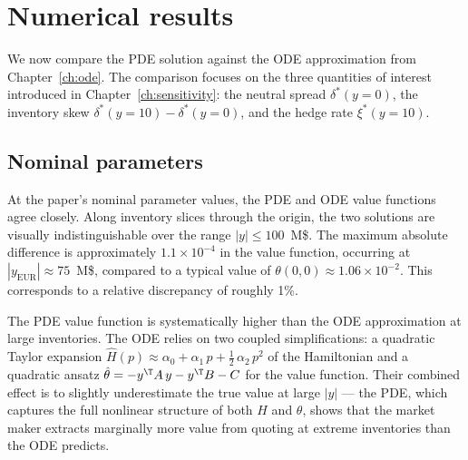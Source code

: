 \section{Numerical results}
\label{sec:pde-results}

We now compare the PDE solution against the ODE approximation from Chapter~\ref{ch:ode}. The comparison focuses on the three quantities of interest introduced in Chapter~\ref{ch:sensitivity}: the neutral spread $\delta^*(y = 0)$, the inventory skew $\delta^*(y = 10) - \delta^*(y = 0)$, and the hedge rate $\xi^*(y = 10)$.


\subsection{Nominal parameters}
\label{sec:pde-nominal}

At the paper's nominal parameter values, the PDE and ODE value functions agree closely. Along inventory slices through the origin, the two solutions are visually indistinguishable over the range $|y| \leq 100$~M\$. The maximum absolute difference is approximately $1.1 \times 10^{-4}$ in the value function, occurring at $|y_{\text{EUR}}| \approx 75$~M\$, compared to a typical value of $\theta(0,0) \approx 1.06 \times 10^{-2}$. This corresponds to a relative discrepancy of roughly 1\%.

The PDE value function is systematically higher than the ODE approximation at large inventories. The ODE relies on two coupled simplifications: a quadratic Taylor expansion $\hat{H}(p) \approx \alpha_0 + \alpha_1\,p + \frac{1}{2}\,\alpha_2\,p^2$ of the Hamiltonian and a quadratic ansatz $\hat\theta = -y^\T A\,y - y^\T B - C$ for the value function. Their combined effect is to slightly underestimate the true value at large $|y|$ --- the PDE, which captures the full nonlinear structure of both $H$ and $\theta$, shows that the market maker extracts marginally more value from quoting at extreme inventories than the ODE predicts.


